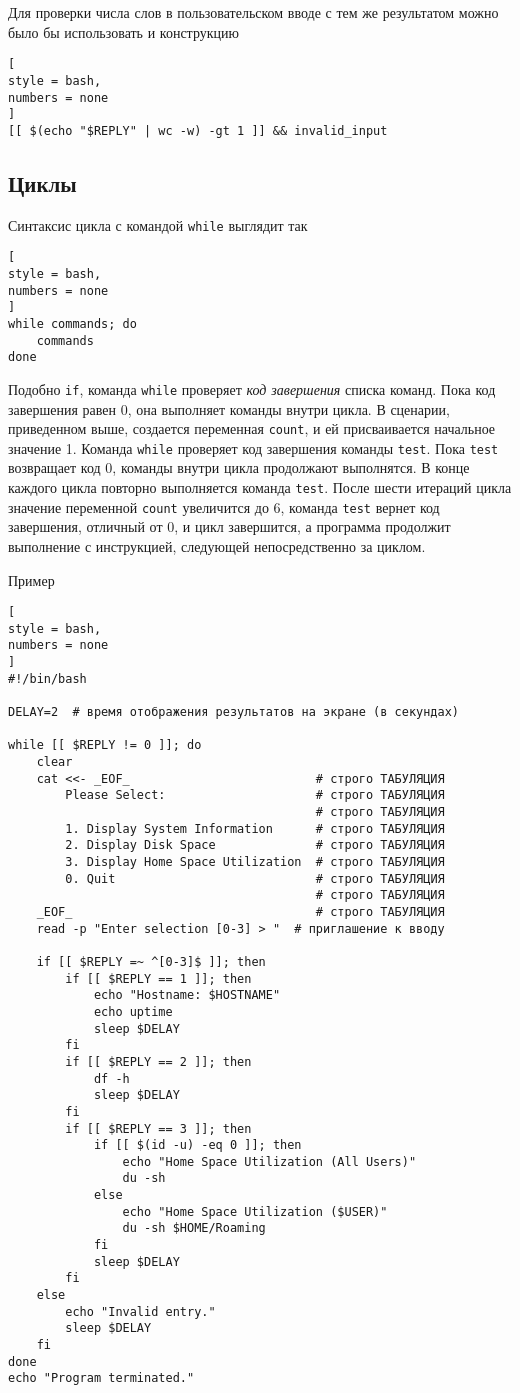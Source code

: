 \documentclass[%
	11pt,
	a4paper,
	utf8,
		]{article}
\begin{document}
Для проверки числа слов в пользовательском вводе с тем же результатом можно было бы использовать и конструкцию
\begin{lstlisting}[
style = bash,
numbers = none
]
[[ $(echo "$REPLY" | wc -w) -gt 1 ]] && invalid_input
\end{lstlisting}

\subsection{Циклы}

Синтаксис цикла с командой \texttt{while} выглядит так
\begin{lstlisting}[
style = bash,
numbers = none
]
while commands; do
    commands
done
\end{lstlisting}

Подобно \texttt{if}, команда \texttt{while} проверяет \emph{код завершения} списка команд. Пока код завершения равен 0, она выполняет команды внутри цикла. В сценарии, приведенном выше, создается переменная \texttt{count}, и ей присваивается начальное значение 1. Команда \texttt{while} проверяет код завершения команды \texttt{test}. Пока \texttt{test} возвращает код 0, команды внутри цикла продолжают выполнятся. В конце каждого цикла повторно выполняется команда \texttt{test}. После шести итераций цикла значение переменной \texttt{count} увеличится до 6, команда \texttt{test} вернет код завершения, отличный от 0, и цикл завершится, а программа продолжит выполнение с инструкцией, следующей непосредственно за циклом.

Пример
\begin{lstlisting}[
style = bash,
numbers = none
]
#!/bin/bash

DELAY=2  # время отображения результатов на экране (в секундах)

while [[ $REPLY != 0 ]]; do
    clear
    cat <<- _EOF_                          # строго ТАБУЛЯЦИЯ
        Please Select:                     # строго ТАБУЛЯЦИЯ
                                           # строго ТАБУЛЯЦИЯ
        1. Display System Information      # строго ТАБУЛЯЦИЯ
        2. Display Disk Space              # строго ТАБУЛЯЦИЯ
        3. Display Home Space Utilization  # строго ТАБУЛЯЦИЯ
        0. Quit                            # строго ТАБУЛЯЦИЯ
                                           # строго ТАБУЛЯЦИЯ
    _EOF_                                  # строго ТАБУЛЯЦИЯ
    read -p "Enter selection [0-3] > "  # приглашение к вводу

    if [[ $REPLY =~ ^[0-3]$ ]]; then
        if [[ $REPLY == 1 ]]; then
            echo "Hostname: $HOSTNAME"
            echo uptime
            sleep $DELAY
        fi
        if [[ $REPLY == 2 ]]; then
            df -h
            sleep $DELAY
        fi
        if [[ $REPLY == 3 ]]; then
            if [[ $(id -u) -eq 0 ]]; then
                echo "Home Space Utilization (All Users)"
                du -sh
            else
                echo "Home Space Utilization ($USER)"
                du -sh $HOME/Roaming
            fi
            sleep $DELAY
        fi
    else
        echo "Invalid entry."
        sleep $DELAY
    fi
done
echo "Program terminated."
\end{lstlisting}
\end{document}
